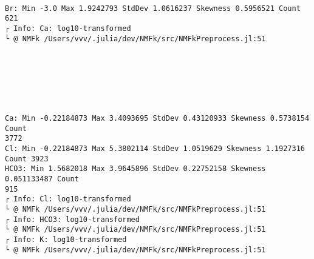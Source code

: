 \documentclass[11pt]{article}
\begin{document}
    \begin{center}
    \end{center}
    { \hspace*{\fill} \\}
    
    \begin{Verbatim}[commandchars=\\\{\}]
Br: Min -3.0 Max 1.9242793 StdDev 1.0616237 Skewness 0.5956521 Count 621
┌ Info: Ca: log10-transformed
└ @ NMFk /Users/vvv/.julia/dev/NMFk/src/NMFkPreprocess.jl:51
    \end{Verbatim}

    \begin{center}
    \end{center}
    { \hspace*{\fill} \\}
    
    \begin{center}
    \end{center}
    { \hspace*{\fill} \\}
    
    \begin{center}
    \end{center}
    { \hspace*{\fill} \\}
    
    \begin{Verbatim}[commandchars=\\\{\}]
Ca: Min -0.22184873 Max 3.4093695 StdDev 0.43120933 Skewness 0.5738154 Count
3772
Cl: Min -0.22184873 Max 5.3802114 StdDev 1.0519629 Skewness 1.1927316 Count 3923
HCO3: Min 1.5682018 Max 3.9645896 StdDev 0.22752158 Skewness 0.051133487 Count
915
┌ Info: Cl: log10-transformed
└ @ NMFk /Users/vvv/.julia/dev/NMFk/src/NMFkPreprocess.jl:51
┌ Info: HCO3: log10-transformed
└ @ NMFk /Users/vvv/.julia/dev/NMFk/src/NMFkPreprocess.jl:51
┌ Info: K: log10-transformed
└ @ NMFk /Users/vvv/.julia/dev/NMFk/src/NMFkPreprocess.jl:51
    \end{Verbatim}
\end{document}
